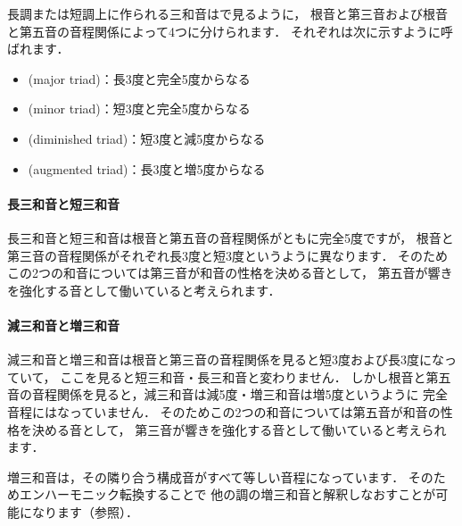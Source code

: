 \documentclass[dvipdfmx,uplatex,b5paper,openany,jbase=12Q,nomag*,textwidth-limit=44%
               ]{gachimuchi}[2020/05/05]
\begin{document}
長調または短調上に作られる三和音はで見るように，
根音と第三音および根音と第五音の音程関係によって4つに分けられます．
それぞれは次に示すように呼ばれます．
\begin{itemize}
  \item {}\xkanjispace(major triad)\xkanjispace：長3度と完全5度からなる
  \item {}\xkanjispace(minor triad)\xkanjispace：短3度と完全5度からなる
  \item {}\xkanjispace(diminished triad)\xkanjispace：短3度と減5度からなる
  \item {}\xkanjispace(augmented triad)\xkanjispace：長3度と増5度からなる
\end{itemize}

\begin{Music}[0.6\linewidth]
  \nostartrule%
  \Startpiece
  \Notes%
  \en%
  \endpiece
\end{Music}

\paragraph{長三和音と短三和音}
長三和音と短三和音は根音と第五音の音程関係がともに完全5度ですが，
根音と第三音の音程関係がそれぞれ長3度と短3度というように異なります．
そのためこの2つの和音については第三音が和音の性格を決める音として，
第五音が響きを強化する音として働いていると考えられます．

\paragraph{減三和音と増三和音}
減三和音と増三和音は根音と第三音の音程関係を見ると短3度および長3度になっていて，
ここを見ると短三和音・長三和音と変わりません．
しかし根音と第五音の音程関係を見ると，減三和音は減5度・増三和音は増5度というように
完全音程にはなっていません．
そのためこの2つの和音については第五音が和音の性格を決める音として，
第三音が響きを強化する音として働いていると考えられます．

増三和音は，その隣り合う構成音がすべて等しい音程になっています．
そのためエンハーモニック転換することで
他の調の増三和音と解釈しなおすことが可能になります（参照）．
\end{document}
